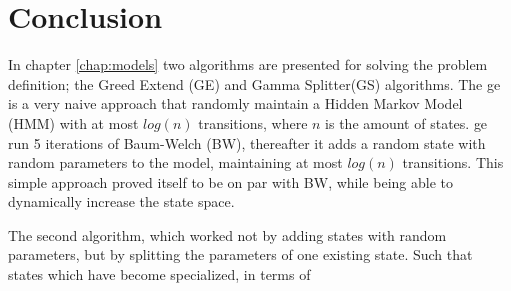 \chapter{Conclusion}
\label{chap:conclusion}
In chapter \ref{chap:models} two algorithms are presented for solving the problem definition; the Greed Extend (GE) and Gamma Splitter(GS) algorithms. The \gls{ge} is a very naive approach that randomly maintain a Hidden Markov Model (HMM) with at most $log(n)$ transitions, where $n$ is the amount of states. \gls{ge} run 5 iterations of Baum-Welch (BW), thereafter it adds a random state with random parameters to the model, maintaining at most $log(n)$ transitions. This simple approach proved itself to be on par with BW, while being able to dynamically increase the state space.

The second algorithm, which worked not by adding states with random parameters, but by splitting the parameters of one existing state. Such that states which have become specialized, in terms of 
